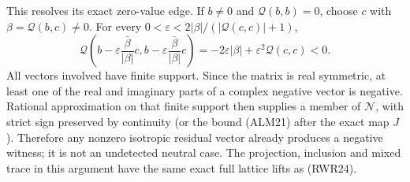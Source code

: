 This resolves its exact zero-value edge. If $b\ne0$ and
$\mathscr Q(b,b)=0$, choose $c$ with $\beta=\mathscr Q(b,c)\ne0$.
For every
$0<\varepsilon<2|\beta|/(|\mathscr Q(c,c)|+1)$,
\begin{equation}\tag{RWR27}
 \mathscr Q\left(b-\varepsilon\frac{\bar\beta}{|\beta|}c,
                 b-\varepsilon\frac{\bar\beta}{|\beta|}c\right)
 =-2\varepsilon|\beta|+\varepsilon^2\mathscr Q(c,c)<0.
\end{equation}
All vectors involved have finite support. Since the matrix is real
symmetric, at least one of the real and imaginary parts of a complex
negative vector is negative. Rational approximation on that finite
support then supplies a member of $\mathscr N$, with strict sign
preserved by continuity (or the bound (ALM21) after the exact map $J$).
Therefore any nonzero isotropic residual vector already produces a
negative witness; it is not an undetected neutral case. The projection,
inclusion and mixed trace in this argument have the same exact full
lattice lifts as (RWR24).
